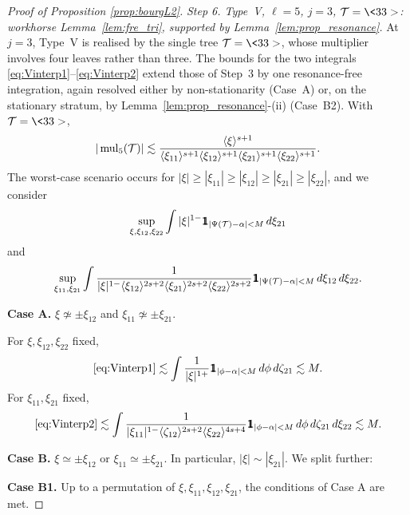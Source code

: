 \begin{proof}[Proof of Proposition \ref{prop:bourgL2}]
\medskip
\noi\textit{Step 6. Type~V, $\ell=5$, $j=3$, $\TT=\<33>$: workhorse Lemma~\ref{lem:fre_tri}, supported by Lemma~\ref{lem:prop_resonance}.}
At $j=3$, Type~V is realised by the single tree $\TT=\<33>$, whose multiplier involves four leaves rather than three. The bounds for the two integrals \eqref{eq:Vinterp1}--\eqref{eq:Vinterp2} extend those of Step~3 by one resonance-free integration, again resolved either by non-stationarity (Case~A) or, on the stationary stratum, by Lemma~\ref{lem:prop_resonance}-(ii) (Case~B2).
With $\TT=\<33>$,
$$
|\operatorname{mul}_5(\mathcal{T})|\lesssim \frac{\langle \xi \rangle^{s+1}}{\langle \xi_{11} \rangle^{s+1}\langle \xi_{12} \rangle^{s+1}\langle \xi_{21} \rangle^{s+1}\langle \xi_{22} \rangle^{s+1}}.
$$
The worst-case scenario occurs for $|\xi|\ge |\xi_{11}|\ge |\xi_{12}|\ge |\xi_{21}|\ge |\xi_{22}|$, and we consider
\begin{equation}\label{eq:Vinterp1}
\sup_{\xi, \xi_{12}, \xi_{22}}\int |\xi|^{1-} \ind_{|\Psi(\TT)-\alpha|<M} \,d\xi_{21}
\end{equation}
and
\begin{equation}\label{eq:Vinterp2}
\sup_{\xi_{11}, \xi_{21}}\int \frac{1}{|\xi|^{1-}\jap{\xi_{12}}^{2s+2}\jap{\xi_{21}}^{2s+2}\jap{\xi_{22}}^{2s+2}}\ind_{|\Psi(\TT)-\alpha|<M} \,d\xi_{12}\,d\xi_{22}.
\end{equation}

\smallskip
\noi\textbf{Case A.} $\xi\not\simeq \pm \xi_{12}$ and $\xi_{11}\not\simeq \pm\xi_{21}$.

\noi For $\xi, \xi_{12}, \xi_{22}$ fixed,
\begin{equation}\label{eq:estVinterp1}
\eqref{eq:Vinterp1} \lesssim \int \frac{1}{|\xi|^{1+}} \ind_{|\phi-\alpha|<M} \,d\phi\,  d\zeta_{21} \lesssim M.
\end{equation}
For $\xi_{11}, \xi_{21}$ fixed,
\begin{equation}\label{eq:estVinterp2}
\eqref{eq:Vinterp2} \lesssim \int \frac{1}{|\xi_{11}|^{1-}\jap{\zeta_{12}}^{2s+2}\jap{\xi_{22}}^{4s+4}} \ind_{|\phi-\alpha|<M}\, d\phi\, d\zeta_{21}\,d\xi_{22} \lesssim M.
\end{equation}

\smallskip
\noi\textbf{Case B.} $\xi\simeq \pm \xi_{12}$ or $\xi_{11}\simeq \pm\xi_{21}$. In particular, $|\xi|\sim |\xi_{21}|$. We split further:

\smallskip
\noi\textbf{Case B1.} Up to a permutation of $\xi, \xi_{11}, \xi_{12}, \xi_{21}$, the conditions of Case A are met.


\end{proof}

